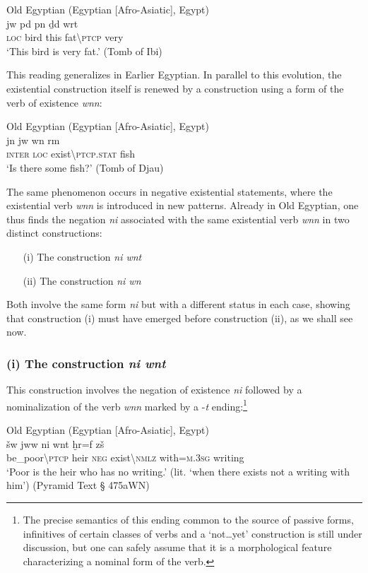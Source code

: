 \documentclass[output=paper,draft,draftmode,colorlinks,citecolor=brown]{langscibook}
\begin{document}
\ea Old Egyptian (Egyptian [Afro-Asiatic], Egypt) \label{ex:AE19}\\
	\gll jw {\ꜣ}pd pn ḏd{\ꜣ} wrt\\
	\textsc{loc} bird this fat\textbackslash\textsc{ptcp} very\\
	\glt ‘This bird is very fat.’ (Tomb of Ibi)
\z 

This reading generalizes in Earlier Egyptian. In parallel to this evolution, the existential construction itself is renewed by a construction using a form of the verb of existence \textit{wnn}:

\ea Old Egyptian (Egyptian [Afro-Asiatic], Egypt) \label{ex:AE20}\\
	\gll jn jw wn rm\\ 
	\textsc{inter} \textsc{loc} exist\textbackslash\textsc{ptcp.stat} fish\\
	\glt ‘Is there some fish?’ (Tomb of Djau)
\z 

\largerpage
The same phenomenon occurs in negative existential statements, where the existential verb \textit{wnn} is introduced in new patterns. Already in Old Egyptian, one thus finds the negation \textit{ni} associated with the same existential verb \textit{wnn} in two distinct constructions: 
\begin{enumerate}
    \item[(i)] The construction \textit{ni wnt} 
    \item[(ii)] The construction \textit{ni wn}
\end{enumerate}
 
Both involve the same form \textit{ni} but with a different status in each case, showing that construction (i) must have emerged before construction (ii), as we shall see now.  


\subsubsection*{(i) The construction \textit{ni wnt}}

This construction involves the negation of existence \textit{ni} followed by a nominalization of the verb \textit{wnn} marked by a -\textit{t} ending:\footnote{The precise semantics of this ending common to the source of passive forms, infinitives of certain classes of verbs and a ‘not…yet’ construction is still under discussion, but one can safely assume that it is a morphological feature characterizing a nominal form of the verb.}

\ea Old Egyptian (Egyptian [Afro-Asiatic], Egypt) \label{ex:AE21}\\
    \gll šw{\ꜣ}                        jw{\ꜥ}w ni           wnt                              ḫr=f                zš\\
    be\_poor\textbackslash\textsc{ptcp} heir   \textsc{neg} exist\textbackslash\textsc{nmlz} with=\textsc{m.3sg} writing \\
    \glt ‘Poor is the heir who has no writing.’ (lit. ‘when there exists not a writing with him’) (Pyramid Text § 475aWN) 
\z 
\end{document}
